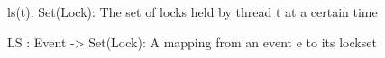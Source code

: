 \documentclass[landscape, a4paper]{article}
\begin{document}
\begin{minipage}[t]{0.195\linewidth}
\begin{betterlist}
		\begin{betterlist}
			\item ls(t): Set(Lock): The set of locks held by thread t at a certain time
			\item LS : Event -> Set(Lock): A mapping from an event e to its lockset
		\end{betterlist}
	\end{betterlist}
\end{minipage}
\end{document}
